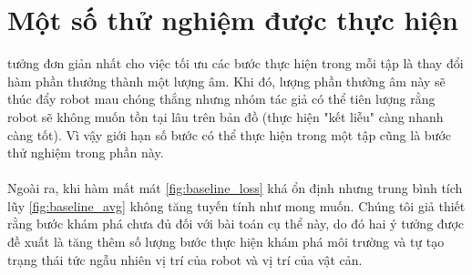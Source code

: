 \section{Một số thử nghiệm được thực hiện}
 tưởng đơn giản nhất cho việc tối ưu các bước thực hiện trong mỗi tập là thay đổi hàm phần thưởng thành một lượng âm. Khi đó, lượng phần thưởng âm này sẽ thúc đẩy robot mau chóng thắng nhưng nhóm tác giả có thể tiên lượng rằng robot sẽ không muốn tồn tại lâu trên bản đồ (thực hiện "kết liễu" càng nhanh càng tốt). Vì vậy giới hạn số bước có thể thực hiện trong một tập cũng là bước thử nghiệm trong phần này.\\
\\
Ngoài ra, khi hàm mất mát \ref{fig:baseline_loss} khá ổn định nhưng trung bình tích lũy \ref{fig:baseline_avg} không tăng tuyến tính như mong muốn. Chúng tôi giả thiết rằng bước khám phá chưa đủ đối với bài toán cụ thể này, do đó hai ý tưởng được đề xuất là tăng thêm số lượng bước thực hiện khám phá môi trường và tự tạo trạng thái tức ngẫu nhiên vị trí của robot và vị trí của vật cản.
\clearpage

